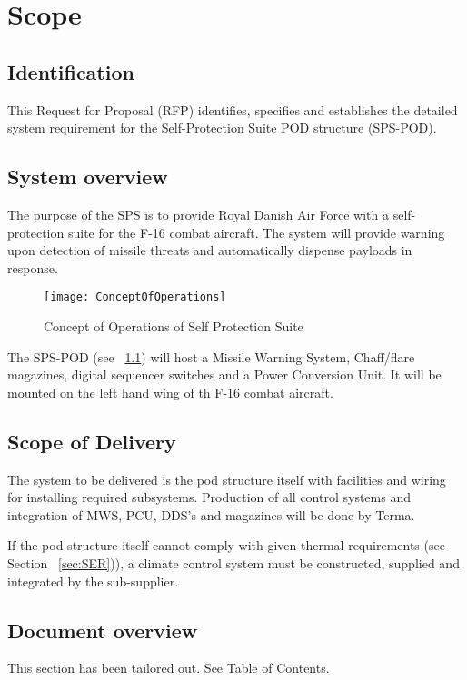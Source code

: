 \documentclass[Main]{subfiles}
\begin{document}
\chapter{Scope}

\section{Identification}
This Request for Proposal (RFP) identifies, specifies and establishes the detailed system requirement for the Self-Protection Suite POD structure (SPS-POD).

\section{System overview}
The purpose of the SPS is to provide Royal Danish Air Force with a self-protection suite for the F-16 combat aircraft. 
The system will provide warning upon detection of missile threats and automatically dispense payloads in response.

\begin{figure}[H]
\centering
\texttt{[image: ConceptOfOperations]}
\caption{Concept of Operations of Self Protection Suite}
\label{fig:conOps}
\end{figure}

The SPS-POD (see ~\ref{fig:conOps}) will host a Missile Warning System, Chaff/flare magazines, digital sequencer switches and a Power Conversion Unit. 
It will be mounted on the left hand wing of th F-16 combat aircraft.

\section{Scope of Delivery}
The system to be delivered is the pod structure itself with facilities and wiring for installing required subsystems. 
Production of all control systems and integration of MWS, PCU, DDS's and magazines will be done by Terma.

If the pod structure itself cannot comply with given thermal requirements (see Section ~\ref{sec:SER})), a climate control system must be constructed, supplied and integrated by the sub-supplier.

\section{Document overview}
This section has been tailored out. See Table of Contents.


\end{document}

